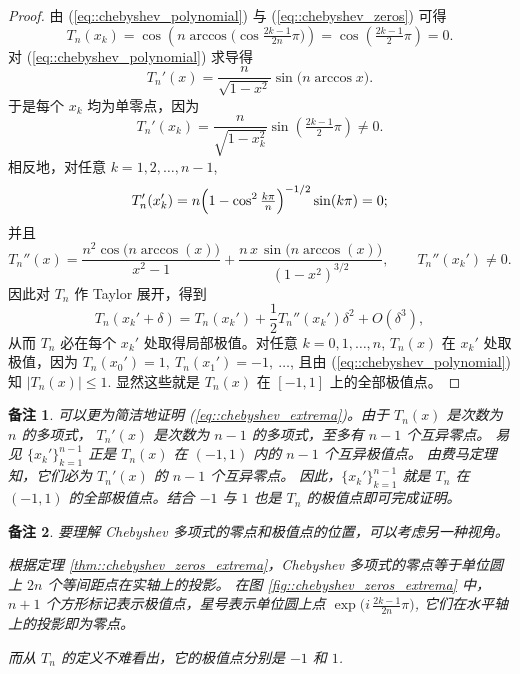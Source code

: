 \documentclass[a4paper]{ctexart}
\newtheorem{remark}{备注}
\numberwithin{theorem}{section}
\numberwithin{equation}{section}
\numberwithin{figure}{section}
\numberwithin{remark}{section}
\begin{document}
\begin{proof}
由 (\ref{eq::chebyshev_polynomial}) 与 (\ref{eq::chebyshev_zeros}) 可得
\begin{equation*}
T_n(x_k)=\cos\!\left(n\arccos\!\bigl(\cos\tfrac{2k-1}{2n}\pi\bigr)\right)
= \cos\!\left(\tfrac{2k-1}{2}\pi\right)=0.
\end{equation*}
对 (\ref{eq::chebyshev_polynomial}) 求导得
\begin{equation*}
T_n'(x)=\frac{n}{\sqrt{1-x^2}}\sin\!\bigl(n\arccos x\bigr).
\end{equation*}
于是每个 $x_k$ 均为单零点，因为
\begin{equation*}
T_n'(x_k)=\frac{n}{\sqrt{1-x_k^2}}\sin\!\left(\tfrac{2k-1}{2}\pi\right)\ne 0.
\end{equation*}
相反地，对任意 $k=1,2,\ldots,n-1$,
\begin{equation*}
T_n'(x_k')=n\Bigl(1-\cos^2\tfrac{k\pi}{n}\Bigr)^{-1/2}\sin(k\pi)=0;
\end{equation*}
并且
\begin{equation*}
T_n''(x)=\frac{n^2\cos\!\bigl(n\arccos(x)\bigr)}{x^2-1}
+\frac{n\,x\,\sin\!\bigl(n\arccos(x)\bigr)}{(1-x^2)^{3/2}},\qquad
T_n''(x_k')\ne 0.
\end{equation*}
因此对 $T_n$ 作 Taylor 展开，得到
\begin{equation*}
T_n(x_k'+\delta)=T_n(x_k')+\frac{1}{2}T_n''(x_k')\delta^2+O(\delta^3),
\end{equation*}
从而 $T_n$ 必在每个 $x_k'$ 处取得局部极值。对任意 $k=0,1,\ldots,n$, 
$T_n(x)$ 在 $x_k'$ 处取极值，因为 $T_n(x_0')=1,\ T_n(x_1')=-1,\ \ldots$, 
且由 (\ref{eq::chebyshev_polynomial}) 知 $\lvert T_n(x)\rvert\le 1$. 
显然这些就是 $T_n(x)$ 在 $[-1,1]$ 上的全部极值点。
\end{proof}

\begin{remark}
可以更为简洁地证明 (\ref{eq::chebyshev_extrema})。由于 $T_n(x)$ 是次数为 $n$ 的多项式，
$T_n'(x)$ 是次数为 $n-1$ 的多项式，至多有 $n-1$ 个互异零点。
易见 $\{x_k'\}_{k=1}^{n-1}$ 正是 $T_n(x)$ 在 $(-1,1)$ 内的 $n-1$ 个互异极值点。
由费马定理知，它们必为 $T_n'(x)$ 的 $n-1$ 个互异零点。
因此，$\{x_k'\}_{k=1}^{n-1}$ 就是 $T_n$ 在 $(-1,1)$ 的全部极值点。结合 $-1$ 与 $1$ 也是 $T_n$ 的极值点即可完成证明。
\end{remark}

\begin{remark}
要理解 Chebyshev 多项式的零点和极值点的位置，可以考虑另一种视角。

根据定理 \ref{thm::chebyshev_zeros_extrema}，Chebyshev 多项式的零点等于单位圆上 $2n$ 个等间距点在实轴上的投影。
在图 \ref{fig::chebyshev_zeros_extrema} 中，$n+1$ 个方形标记表示极值点，星号表示单位圆上点 $\exp\!\bigl(i\,\tfrac{2k-1}{2n}\pi\bigr)$, 
它们在水平轴上的投影即为零点。

而从 $T_n$ 的定义不难看出，它的极值点分别是 $-1$ 和 $1$.
\end{remark}
\end{document}
